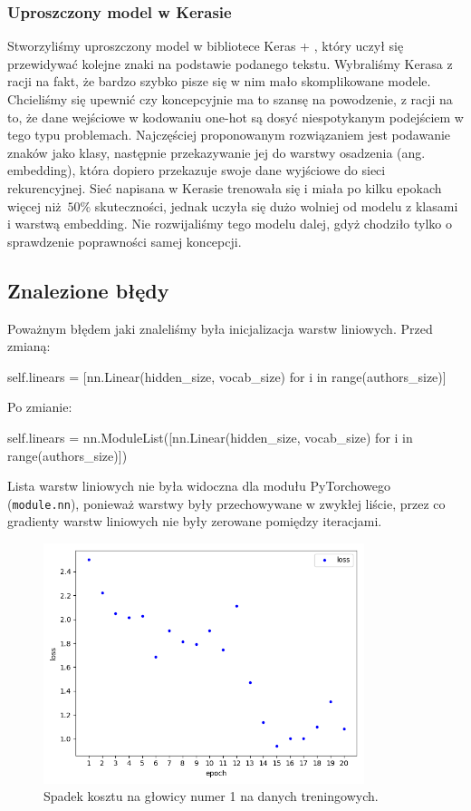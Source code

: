 \subsubsection{Uproszczony model w Kerasie}
Stworzyliśmy uproszczony model w bibliotece Keras +  , który uczył się przewidywać kolejne znaki na podstawie podanego tekstu. 
Wybraliśmy Kerasa z racji na fakt, że bardzo szybko pisze się w nim mało skomplikowane modele.
Chcieliśmy się upewnić czy koncepcyjnie ma to szansę na powodzenie, z racji na to, że dane wejściowe w kodowaniu one-hot 
są dosyć niespotykanym podejściem w tego typu problemach. Najczęściej proponowanym rozwiązaniem jest podawanie znaków jako klasy, następnie 
przekazywanie jej do warstwy osadzenia (ang. embedding), która dopiero przekazuje swoje dane wyjściowe do sieci rekurencyjnej. 
Sieć napisana w Kerasie trenowała się i miała po kilku epokach więcej niż $50\%$ skuteczności, jednak uczyła się
dużo wolniej od modelu z klasami i warstwą embedding. Nie rozwijaliśmy tego modelu dalej, gdyż chodziło tylko o sprawdzenie poprawności samej koncepcji.

\newpage
\subsection{Znalezione błędy}
Poważnym błędem jaki znaleliśmy była inicjalizacja warstw liniowych.
Przed zmianą:
\begin{python}
self.linears = [nn.Linear(hidden_size, vocab_size) for i in range(authors_size)]

\end{python} 
Po zmianie:
\begin{python}
self.linears = nn.ModuleList([nn.Linear(hidden_size, vocab_size) for i in range(authors_size)])

\end{python} 

Lista warstw liniowych nie była widoczna dla modułu PyTorchowego (\texttt{module.nn}), ponieważ warstwy były przechowywane
w zwykłej liście, przez co gradienty warstw liniowych nie były zerowane pomiędzy iteracjami.

\begin{figure}[H]
	\centering
	\includegraphics[height=7cm]{./images/loss_decrease.png}
	\caption{Spadek kosztu na głowicy numer 1 na danych treningowych.}
	\label{fig:test5}
\end{figure}

